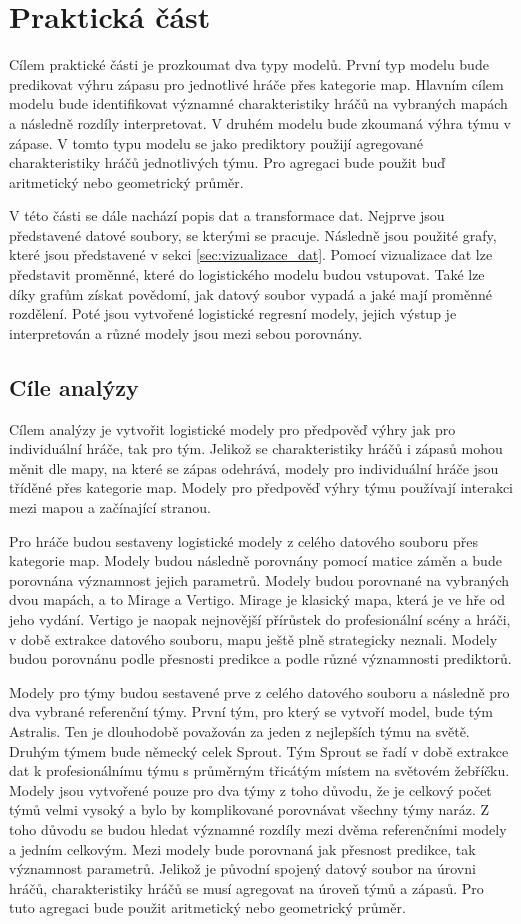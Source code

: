 \chapter{Praktická část}
{\color{red}
Cílem praktické části je prozkoumat dva typy modelů. První typ modelu bude predikovat výhru zápasu pro jednotlivé hráče přes kategorie map. Hlavním cílem 
modelu bude identifikovat významné charakteristiky hráčů na vybraných mapách a následně rozdíly interpretovat. V druhém modelu bude zkoumaná výhra týmu v zápase.
V tomto typu modelu se jako prediktory použijí agregované charakteristiky hráčů jednotlivých týmu. Pro agregaci bude použit buď aritmetický nebo geometrický průměr. 

V této části se dále nachází popis dat a transformace dat. Nejprve jsou představené datové soubory,
se kterými se pracuje. Následně jsou použité grafy, které jsou představené v sekci \ref{sec:vizualizace_dat}. Pomocí vizualizace dat lze představit proměnné, které
do logistického modelu budou vstupovat. Také lze díky grafům získat povědomí, jak datový soubor vypadá a jaké mají proměnné rozdělení.
Poté jsou vytvořené logistické regresní modely, jejich výstup je interpretován a různé modely jsou mezi sebou porovnány.
}

{\color{red}
\section{Cíle analýzy}
Cílem analýzy je vytvořit logistické modely pro předpověď výhry jak pro individuální hráče, tak pro tým. Jelikož se charakteristiky hráčů i zápasů mohou měnit dle mapy,
na které se zápas odehrává, modely pro individuální hráče jsou tříděné přes kategorie map. Modely pro předpověď výhry týmu používají interakci mezi mapou a začínající
stranou.

Pro hráče budou sestaveny logistické modely z celého datového souboru přes kategorie map. Modely budou následně porovnány pomocí matice záměn
a bude porovnána významnost jejich parametrů. Modely budou porovnané na vybraných dvou mapách, a to Mirage a Vertigo. Mirage je klasický mapa, která je
ve hře od jeho vydání. Vertigo je naopak nejnovější přírůstek do profesionální scény a hráči, v době extrakce datového souboru, mapu ještě plně strategicky 
neznali. Modely budou porovnánu podle přesnosti predikce a podle různé významnosti prediktorů.

Modely pro týmy budou sestavené prve z celého datového souboru a následně pro dva vybrané referenční týmy. První tým, pro který se vytvoří model, bude tým Astralis.
Ten je dlouhodobě považován za jeden z nejlepších týmu na světě. Druhým týmem bude německý celek Sprout. Tým Sprout se řadí v době
extrakce dat k profesionálnímu týmu s průměrným třicátým místem na světovém žebříčku. Modely jsou vytvořené pouze pro dva týmy z toho důvodu, že je celkový
 počet týmů velmi vysoký a bylo by komplikované 
porovnávat všechny týmy naráz. Z toho důvodu se budou hledat významné rozdíly mezi dvěma referenčními modely a jedním celkovým. Mezi modely bude porovnaná jak přesnost
predikce, tak významnost parametrů. Jelikož je původní spojený datový soubor na úrovni hráčů, charakteristiky hráčů se musí agregovat na úroveň týmů a zápasů. Pro tuto
agregaci bude použit aritmetický nebo geometrický průměr.
}

